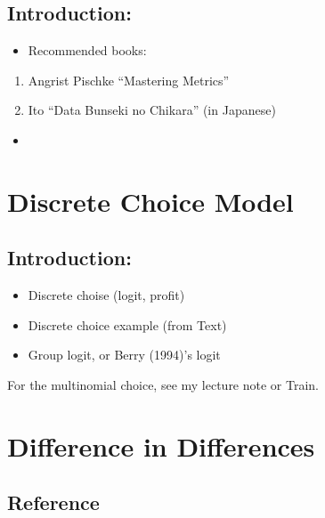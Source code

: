 \documentclass[]{book}
\providecommand{\tightlist}{%
  \setlength{\itemsep}{0pt}\setlength{\parskip}{0pt}}
\begin{document}
\section{Introduction:}\label{introduction-3}

\begin{itemize}
\tightlist
\item
  Recommended books:
\end{itemize}

\begin{enumerate}
\def\labelenumi{\arabic{enumi}.}
\tightlist
\item
  Angrist Pischke ``Mastering Metrics''
\item
  Ito ``Data Bunseki no Chikara'' (in Japanese)
\end{enumerate}

\begin{itemize}
\item
\end{itemize}

\chapter{Discrete Choice Model}\label{discrete-choice-model}

\section{Introduction:}\label{introduction-4}

\begin{itemize}
\tightlist
\item
  Discrete choise (logit, profit)
\item
  Discrete choice example (from Text)
\item
  Group logit, or Berry (1994)'s logit
\end{itemize}

For the multinomial choice, see my lecture note or Train.

\chapter{Difference in Differences}\label{difference-in-differences}

\section{Reference}\label{reference}
\end{document}
